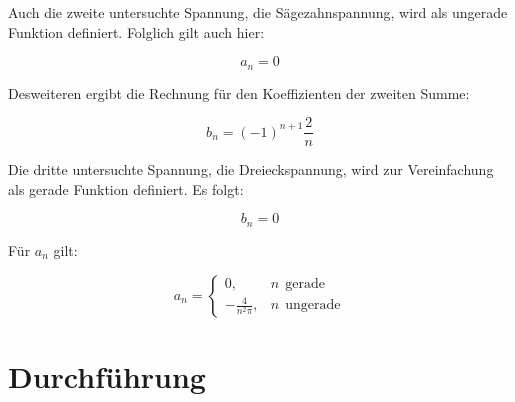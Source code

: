\documentclass[
  bibliography=totoc,     %
  captions=tableheading,  %
  titlepage=firstiscover, %
]{scrartcl}
\begin{document}
Auch die zweite untersuchte Spannung, die Sägezahnspannung, wird als ungerade
Funktion definiert. Folglich gilt auch hier:

\begin{equation}
	a_n=0
\end{equation}

Desweiteren ergibt die Rechnung für den Koeffizienten der zweiten Summe:

\begin{equation}
	b_n=(-1)^{n+1}\frac{2}{n}
  \label{sägezahn}
\end{equation}

Die dritte untersuchte Spannung, die Dreieckspannung, wird zur Vereinfachung
als gerade Funktion definiert. Es folgt:

\begin{equation}
	b_n=0
\end{equation}

Für $a_n$ gilt:

\begin{equation}
	a_n=
	\begin{cases}
		0,  & n \:\:\mathup{gerade}\\
		-\frac{4}{n^2\pi}, &n \:\:\mathup{ungerade}
	\end{cases}
\label{dreieck}
\end{equation}
\section{Durchführung}
\end{document}
